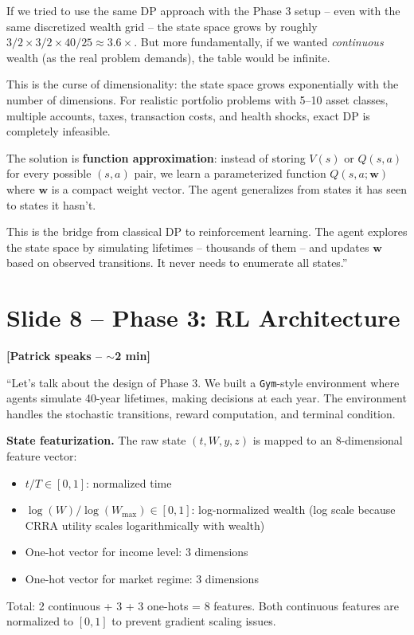 \documentclass[11pt, letterpaper]{article}
\begin{document}
If we tried to use the same DP approach with the Phase 3 setup -- even with the same discretized wealth grid -- the state space grows by roughly $3/2 \times 3/2 \times 40/25 \approx 3.6\times$. But more fundamentally, if we wanted \emph{continuous} wealth (as the real problem demands), the table would be infinite.

This is the curse of dimensionality: the state space grows exponentially with the number of dimensions. For realistic portfolio problems with 5--10 asset classes, multiple accounts, taxes, transaction costs, and health shocks, exact DP is completely infeasible.

The solution is \textbf{function approximation}: instead of storing $V(s)$ or $Q(s,a)$ for every possible $(s,a)$ pair, we learn a parameterized function $Q(s, a; \mathbf{w})$ where $\mathbf{w}$ is a compact weight vector. The agent generalizes from states it has seen to states it hasn't.

This is the bridge from classical DP to reinforcement learning. The agent explores the state space by simulating lifetimes -- thousands of them -- and updates $\mathbf{w}$ based on observed transitions. It never needs to enumerate all states.''

\section{Slide 8 -- Phase 3: RL Architecture}

\textbf{[Patrick speaks -- $\sim$2 min]}

``Let's talk about the design of Phase 3. We built a \texttt{Gym}-style environment where agents simulate 40-year lifetimes, making decisions at each year. The environment handles the stochastic transitions, reward computation, and terminal condition.

\textbf{State featurization.} The raw state $(t, W, y, z)$ is mapped to an 8-dimensional feature vector:
\begin{itemize}
\item $t/T \in [0,1]$: normalized time
\item $\log(W) / \log(W_{\max}) \in [0,1]$: log-normalized wealth (log scale because CRRA utility scales logarithmically with wealth)
\item One-hot vector for income level: 3 dimensions
\item One-hot vector for market regime: 3 dimensions
\end{itemize}
Total: 2 continuous + 3 + 3 one-hots = 8 features. Both continuous features are normalized to $[0,1]$ to prevent gradient scaling issues.
\end{document}
